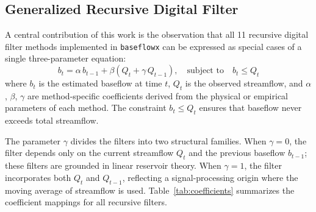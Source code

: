\documentclass[hydrology,article,submit,pdftex,moreauthors]{Definitions/mdpi}
\begin{document}
\subsection{Generalized Recursive Digital Filter}
\label{sec:generalized_filter}

A central contribution of this work is the observation that all 11 recursive digital filter methods implemented in \texttt{baseflowx} can be expressed as special cases of a single three-parameter equation:
\begin{equation}
\label{eq:generalized}
b_t = \alpha \, b_{t-1} + \beta \left( Q_t + \gamma \, Q_{t-1} \right), \quad \text{subject to} \quad b_t \leq Q_t
\end{equation}
where $b_t$ is the estimated baseflow at time $t$, $Q_t$ is the observed streamflow, and $\alpha$, $\beta$, $\gamma$ are method-specific coefficients derived from the physical or empirical parameters of each method. The constraint $b_t \leq Q_t$ ensures that baseflow never exceeds total streamflow.

The parameter $\gamma$ divides the filters into two structural families. When $\gamma = 0$, the filter depends only on the current streamflow $Q_t$ and the previous baseflow $b_{t-1}$; these filters are grounded in linear reservoir theory. When $\gamma = 1$, the filter incorporates both $Q_t$ and $Q_{t-1}$, reflecting a signal-processing origin where the moving average of streamflow is used. Table~\ref{tab:coefficients} summarizes the coefficient mappings for all recursive filters.
\end{document}
